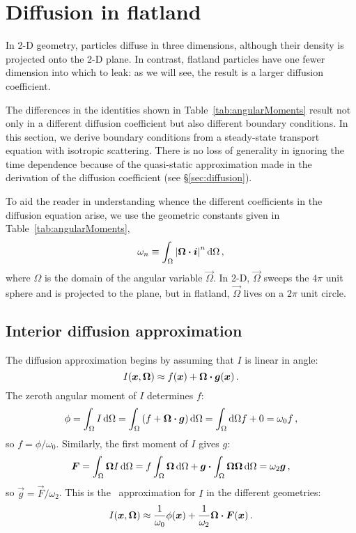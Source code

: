 \section{Diffusion in flatland}

In 2-D geometry, particles diffuse in three dimensions, although their density
is projected onto the 2-D plane. In contrast, flatland particles have one fewer
dimension into which to leak: as we will see, the result is a larger diffusion
coefficient.

The differences in the identities shown in Table~\ref{tab:angularMoments}
result not
only in a different diffusion coefficient but also different boundary
conditions. In this section, we derive boundary conditions from a steady-state
transport equation with isotropic scattering. There is no loss of generality in
ignoring the time dependence because of the quasi-static approximation made in
the derivation of the diffusion coefficient (see \S\ref{sec:diffusion}).

To aid the reader in understanding whence the different coefficients in the
diffusion equation arise, we use the geometric constants given in
Table~\ref{tab:angularMoments},
\begin{equation*}
  \omega_n \equiv \int_\Omega \left| \bm{\Omega} \bm{\cdot} \bm{i} \right|^n \mathop{}\!\mathrm{d} \Omega\,,
\end{equation*}
where $\Omega$ is the domain of the angular variable $\vec{\Omega}$. In 2-D,
$\vec{\Omega}$ sweeps the $4\pi$ unit sphere and is projected to the plane, but
in flatland, $\vec{\Omega}$ lives on a $2\pi$ unit circle.

\subsection{Interior diffusion approximation}

The diffusion approximation begins by assuming that $I$ is linear in angle:
\begin{equation*}
  I(\bm{x}, \bm{\Omega}) \approx f(\bm{x}) + \bm{\Omega} \bm{\cdot}
  \bm{g}(\bm{x})\,.
\end{equation*}
The zeroth angular moment of $I$ determines $f$:
\begin{equation*}
  \phi = \int_\Omega I \mathop{}\!\mathrm{d} \Omega
= \int_\Omega \left( f + \bm{\Omega}\bm{\cdot} \bm{g} \right) \mathop{}\!\mathrm{d}\Omega
= \int_\Omega\mathop{}\!\mathrm{d}\Omega f + 0
= \omega_0 f \,,
\end{equation*}
so $f = \phi/\omega_0$. Similarly, the first moment of $I$ gives $g$:
\begin{equation*}
  \bm{F} = \int_\Omega \bm{\Omega} I \mathop{}\!\mathrm{d} \Omega
= f \int_\Omega \bm{\Omega} \mathop{}\!\mathrm{d}\Omega
  + \bm{g} \bm{\cdot} \int_\Omega \bm{\Omega}\bm{\Omega} \mathop{}\!\mathrm{d}\Omega
= \omega_2 \bm{g} \,,
\end{equation*}
so $\vec{g} = \vec{F}/\omega_2$. This is the \Pone\ approximation for $I$ in the different geometries:
\begin{equation}\label{eq:ssPone}
  I(\bm{x}, \bm{\Omega})
  \approx \frac{1}{\omega_0} \phi(\bm{x})
  + \frac{1}{\omega_2} \bm{\Omega} \bm{\cdot} \bm{F}(\bm{x})\,.
\end{equation}

